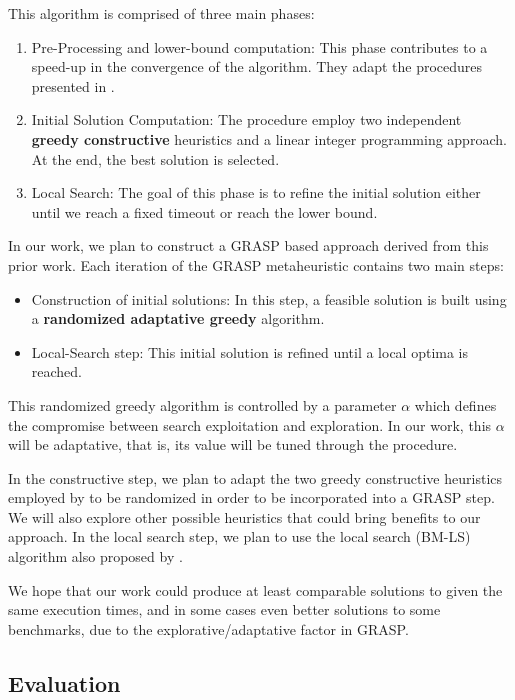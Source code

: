 \documentclass[12pt]{article}
\begin{document}
This algorithm is comprised of three main phases:
\begin{enumerate}
  \item Pre-Processing and lower-bound computation: This phase contributes to a speed-up in the convergence of the algorithm. They adapt the procedures presented in \cite{dell2012bin}.
  \item Initial Solution Computation: The procedure employ two independent \textbf{greedy constructive} heuristics and a linear integer programming approach. At the end, the best solution is selected.
  \item Local Search: The goal of this phase is to refine the initial solution either until we reach a fixed timeout or reach the lower bound. 
\end{enumerate}

In our work, we plan to construct a GRASP based approach derived from this prior work. Each iteration of the GRASP metaheuristic contains two main steps:
\begin{itemize}
  \item Construction of initial solutions: In this step, a feasible solution is built using a \textbf{randomized adaptative greedy} algorithm.
  \item Local-Search step: This initial solution is refined until a local optima is reached. 
 \end{itemize}

 This randomized greedy algorithm is controlled by a parameter \(\alpha\) which defines the compromise between search exploitation and exploration. In our work, this \(\alpha\) will be adaptative, that is, its value will be tuned through the procedure.

 In the constructive step, we plan to adapt the two greedy constructive heuristics employed by \cite{kramer:17} to be randomized in order to be incorporated into a GRASP step. We will also explore other possible heuristics that could bring benefits to our approach. In the local search step, we plan to use the local search (BM-LS) algorithm also proposed by \cite{kramer:17}.

 We hope that our work could produce at least comparable solutions to \cite{kramer:17} given the same execution times, and in some cases even better solutions to some benchmarks, due to the explorative/adaptative factor in GRASP.
 
 \subsection{Evaluation}
\end{document}
